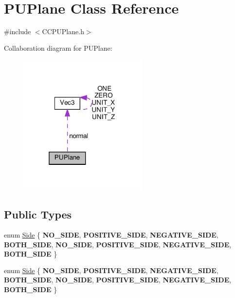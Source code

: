 \hypertarget{classPUPlane}{}\section{P\+U\+Plane Class Reference}
\label{classPUPlane}


{\ttfamily \#include $<$C\+C\+P\+U\+Plane.\+h$>$}



Collaboration diagram for P\+U\+Plane\+:
\nopagebreak
\begin{figure}[H]
\begin{center}
\leavevmode
\includegraphics[width=183pt]{classPUPlane__coll__graph}
\end{center}
\end{figure}
\subsection*{Public Types}
\begin{DoxyCompactItemize}
\item 
enum \hyperlink{classPUPlane_a9fa81224a5c3d8ed875f2bacfa01790c}{Side} \{ \newline
{\bfseries N\+O\+\_\+\+S\+I\+DE}, 
{\bfseries P\+O\+S\+I\+T\+I\+V\+E\+\_\+\+S\+I\+DE}, 
{\bfseries N\+E\+G\+A\+T\+I\+V\+E\+\_\+\+S\+I\+DE}, 
{\bfseries B\+O\+T\+H\+\_\+\+S\+I\+DE}, 
\newline
{\bfseries N\+O\+\_\+\+S\+I\+DE}, 
{\bfseries P\+O\+S\+I\+T\+I\+V\+E\+\_\+\+S\+I\+DE}, 
{\bfseries N\+E\+G\+A\+T\+I\+V\+E\+\_\+\+S\+I\+DE}, 
{\bfseries B\+O\+T\+H\+\_\+\+S\+I\+DE}
 \}
\item 
enum \hyperlink{classPUPlane_a9fa81224a5c3d8ed875f2bacfa01790c}{Side} \{ \newline
{\bfseries N\+O\+\_\+\+S\+I\+DE}, 
{\bfseries P\+O\+S\+I\+T\+I\+V\+E\+\_\+\+S\+I\+DE}, 
{\bfseries N\+E\+G\+A\+T\+I\+V\+E\+\_\+\+S\+I\+DE}, 
{\bfseries B\+O\+T\+H\+\_\+\+S\+I\+DE}, 
\newline
{\bfseries N\+O\+\_\+\+S\+I\+DE}, 
{\bfseries P\+O\+S\+I\+T\+I\+V\+E\+\_\+\+S\+I\+DE}, 
{\bfseries N\+E\+G\+A\+T\+I\+V\+E\+\_\+\+S\+I\+DE}, 
{\bfseries B\+O\+T\+H\+\_\+\+S\+I\+DE}
 \}
\end{DoxyCompactItemize}
